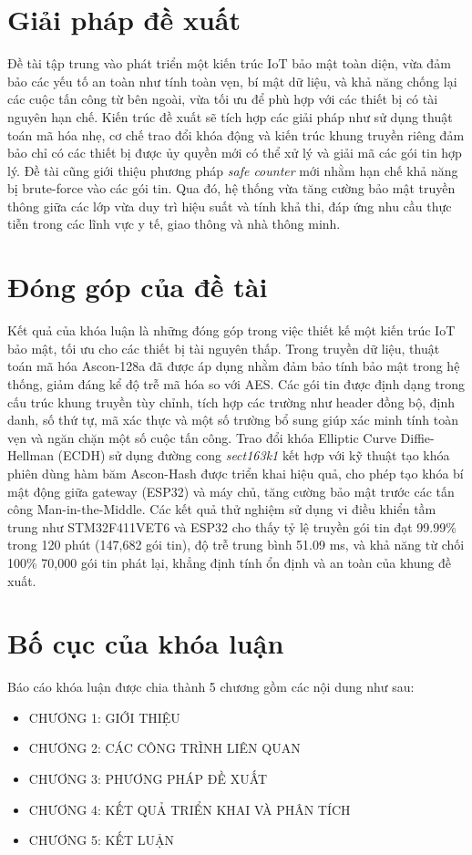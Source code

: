 \section{Giải pháp đề xuất}
Đề tài tập trung vào phát triển một kiến trúc IoT bảo mật toàn diện, vừa đảm bảo các yếu tố an toàn như tính toàn vẹn, bí mật dữ liệu, và khả năng chống lại các cuộc tấn công từ bên ngoài, vừa tối ưu để phù hợp với các thiết bị có tài nguyên hạn chế. Kiến trúc đề xuất sẽ tích hợp các giải pháp như sử dụng thuật toán mã hóa nhẹ, cơ chế trao đổi khóa động và kiến trúc khung truyền riêng đảm bảo chỉ có các thiết bị được ủy quyền mới có thể xử lý và giải mã các gói tin hợp lý. Đề tài cũng giới thiệu phương pháp \textit{safe counter} mới nhằm hạn chế khả năng bị brute-force vào các gói tin. Qua đó, hệ thống vừa tăng cường bảo mật truyền thông giữa các lớp vừa duy trì hiệu suất và tính khả thi, đáp ứng nhu cầu thực tiễn trong các lĩnh vực y tế, giao thông và nhà thông minh.

\section{Đóng góp của đề tài}
Kết quả của khóa luận là những đóng góp trong việc thiết kế một kiến trúc IoT bảo mật, tối ưu cho các thiết bị tài nguyên thấp. Trong truyền dữ liệu, thuật toán mã hóa Ascon-128a đã được áp dụng nhằm đảm bảo tính bảo mật trong hệ thống, giảm đáng kể độ trễ mã hóa so với AES. Các gói tin được định dạng trong cấu trúc khung truyền tùy chỉnh, tích hợp các trường như header đồng bộ, định danh, số thứ tự, mã xác thực và một số trường bổ sung giúp xác minh tính toàn vẹn và ngăn chặn một số cuộc tấn công. Trao đổi khóa Elliptic Curve Diffie-Hellman (ECDH) sử dụng đường cong \textit{sect163k1} kết hợp với kỹ thuật tạo khóa phiên dùng hàm băm Ascon-Hash được triển khai hiệu quả, cho phép tạo khóa bí mật động giữa gateway (ESP32) và máy chủ, tăng cường bảo mật trước các tấn công Man-in-the-Middle. Các kết quả thử nghiệm sử dụng vi điều khiển tầm trung như STM32F411VET6 và ESP32 cho thấy tỷ lệ truyền gói tin đạt 99.99\% trong 120 phút (147,682 gói tin), độ trễ trung bình 51.09 ms, và khả năng từ chối 100\% 70,000 gói tin phát lại, khẳng định tính ổn định và an toàn của khung đề xuất. 

\section{Bố cục của khóa luận}

Báo cáo khóa luận được chia thành 5 chương gồm các nội dung như sau:
\begin{itemize}
    \item CHƯƠNG 1: GIỚI THIỆU
    \item CHƯƠNG 2: CÁC CÔNG TRÌNH LIÊN QUAN
    \item CHƯƠNG 3: PHƯƠNG PHÁP ĐỀ XUẤT
    \item CHƯƠNG 4: KẾT QUẢ TRIỂN KHAI VÀ PHÂN TÍCH
    \item CHƯƠNG 5: KẾT LUẬN
\end{itemize}

